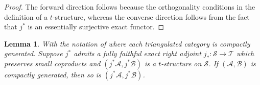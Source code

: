 \documentclass[11pt]{amsart}
\theoremstyle{plain}
\newtheorem{lemma}[theorem]{Lemma}
\theoremstyle{definition}
\numberwithin{equation}{section}
\numberwithin{theorem}{section}
\begin{document}
\begin{proof}
    The forward direction follows because the orthogonality conditions in the definition of a $t$-structure, whereas the converse direction follows from the fact that $j^\ast$ is an essentially surjective exact functor. 
\end{proof}

\begin{lemma}\label{lem:induced_t_structure_verdier_localization2}
    With the notation of  where each triangulated category is compactly generated. Suppose $j^\ast$ admits a fully faithful exact right adjoint $j_\ast \colon \mathcal{S} \to \mathcal{T}$ which preserves small coproducts and $(j^\ast \mathcal{A}, j^\ast \mathcal{B})$ is a $t$-structure on $\mathcal{S}$. If $(\mathcal{A},\mathcal{B})$ is compactly generated, then so is $(j^\ast \mathcal{A}, j^\ast \mathcal{B})$.
\end{lemma}
\end{document}
